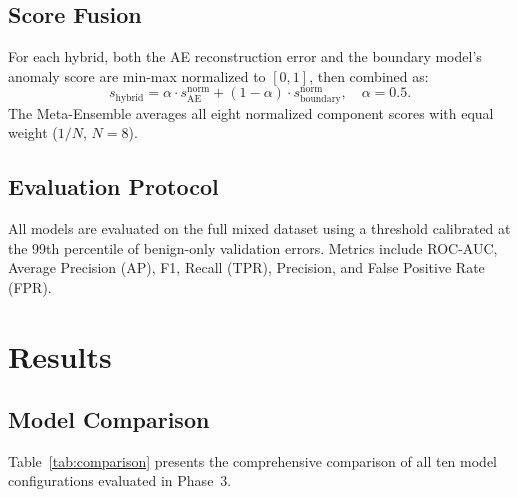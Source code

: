 \documentclass[10pt,conference]{IEEEtran}
\begin{document}
\subsection{Score Fusion}

For each hybrid, both the AE reconstruction error and the boundary
model's anomaly score are min-max normalized to $[0,1]$, then combined
as:
\begin{equation}
  s_{\text{hybrid}} = \alpha \cdot s_{\text{AE}}^{\text{norm}}
                    + (1-\alpha) \cdot s_{\text{boundary}}^{\text{norm}},
  \quad \alpha = 0.5.
\end{equation}
The Meta-Ensemble averages all eight normalized component scores with
equal weight ($1/N$, $N=8$).

\subsection{Evaluation Protocol}

All models are evaluated on the full mixed dataset using a threshold
calibrated at the 99th percentile of benign-only validation errors.
Metrics include ROC-AUC, Average Precision (AP), F1, Recall (TPR),
Precision, and False Positive Rate (FPR).

\section{Results}
\label{sec:results}

\subsection{Model Comparison}

Table~\ref{tab:comparison} presents the comprehensive comparison of all
ten model configurations evaluated in Phase~3.
\end{document}
